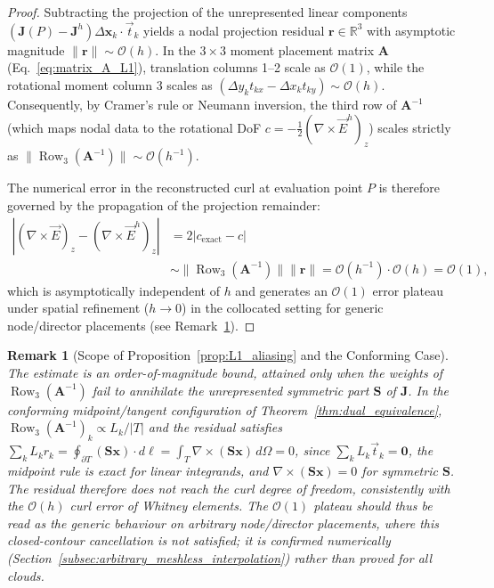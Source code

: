 \documentclass[preprint,12pt]{elsarticle}
\newtheorem{remark}{Remark}
\begin{document}
\begin{proof}
    Subtracting the projection of the unrepresented linear components $(\mathbf{J}(P) - \mathbf{J}^h) \Delta\mathbf{x}_k \cdot \vec{t}_k$ yields a nodal projection residual $\mathbf{r} \in \mathbb{R}^3$ with asymptotic magnitude $\|\mathbf{r}\| \sim \mathcal{O}(h)$. In the $3 \times 3$ moment placement matrix $\mathbf{A}$ (Eq.~\eqref{eq:matrix_A_L1}), translation columns 1--2 scale as $\mathcal{O}(1)$, while the rotational moment column 3 scales as $(\Delta y_k t_{kx} - \Delta x_k t_{ky}) \sim \mathcal{O}(h)$. Consequently, by Cramer's rule or Neumann inversion, the third row of $\mathbf{A}^{-1}$ (which maps nodal data to the rotational DoF $c = -\frac{1}{2}(\nabla \times \vec{E}^h)_z$) scales strictly as $\|\operatorname{Row}_3(\mathbf{A}^{-1})\| \sim \mathcal{O}(h^{-1})$.

    The numerical error in the reconstructed curl at evaluation point $P$ is therefore governed by the propagation of the projection remainder:
    \begin{equation}
        \begin{aligned}
            |(\nabla \times \vec{E})_z - (\nabla \times \vec{E}^h)_z| & = 2 |c_{\mathrm{exact}} - c|                                                                                               \\
                                                                      & \sim \|\operatorname{Row}_3(\mathbf{A}^{-1})\| \|\mathbf{r}\| = \mathcal{O}(h^{-1}) \cdot \mathcal{O}(h) = \mathcal{O}(1),
        \end{aligned}
    \end{equation}
    which is asymptotically independent of $h$ and generates an $\mathcal{O}(1)$ error plateau under spatial refinement ($h \to 0$) in the collocated setting for generic node/director placements (see Remark~\ref{rem:prop1_scope}).
\end{proof}

\begin{remark}[Scope of Proposition~\ref{prop:L1_aliasing} and the Conforming Case]
    \label{rem:prop1_scope}
    The estimate is an order-of-magnitude bound, attained only when the weights of $\operatorname{Row}_3(\mathbf{A}^{-1})$ fail to annihilate the unrepresented symmetric part $\mathbf{S}$ of $\mathbf{J}$. In the conforming midpoint/tangent configuration of Theorem~\ref{thm:dual_equivalence}, $\operatorname{Row}_3(\mathbf{A}^{-1})_k \propto L_k/|T|$ and the residual satisfies $\sum_k L_k r_k = \oint_{\partial T}(\mathbf{S}\mathbf{x})\cdot d\boldsymbol{\ell} = \int_T \nabla\times(\mathbf{S}\mathbf{x})\,d\Omega = 0$, since $\sum_k L_k \vec{t}_k=\mathbf{0}$, the midpoint rule is exact for linear integrands, and $\nabla\times(\mathbf{S}\mathbf{x})=0$ for symmetric $\mathbf{S}$. The residual therefore does not reach the curl degree of freedom, consistently with the $\mathcal{O}(h)$ curl error of Whitney elements. The $\mathcal{O}(1)$ plateau should thus be read as the generic behaviour on arbitrary node/director placements, where this closed-contour cancellation is not satisfied; it is confirmed numerically (Section~\ref{subsec:arbitrary_meshless_interpolation}) rather than proved for all clouds.
\end{remark}
\end{document}

